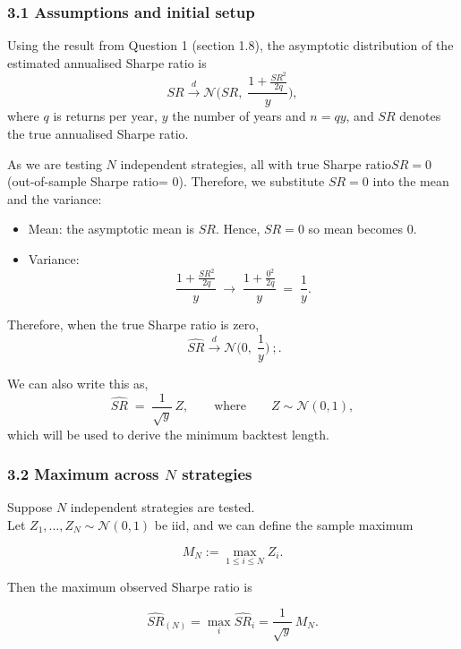 \documentclass[
  12pt,
]{article}
\providecommand{\tightlist}{%
  \setlength{\itemsep}{0pt}\setlength{\parskip}{0pt}}
\begin{document}
\subsubsection{3.1 Assumptions and initial
setup}\label{assumptions-and-initial-setup}

Using the result from Question 1 (section 1.8), the asymptotic
distribution of the estimated annualised Sharpe ratio is \[
\widehat{SR}\xrightarrow{d} \mathcal{N}\!\Big(SR,\; \frac{1+\tfrac{SR^2}{2q}}{y}\Big),
\] where \(q\) is returns per year, \(y\) the number of years and
\(n=qy\), and \(SR\) denotes the true annualised Sharpe ratio.

As we are testing \(N\) independent strategies, all with true Sharpe
ratio\(SR = 0\) (out-of-sample Sharpe ratio= 0). Therefore, we
substitute \(SR=0\) into the mean and the variance:

\begin{itemize}
\tightlist
\item
  Mean: the asymptotic mean is \(SR\). Hence, \(SR=0\) so mean becomes
  \(0\).
\item
  Variance: \[
  \frac{1+\tfrac{SR^2}{2q}}{y}
  \;\longrightarrow\;
  \frac{1+\tfrac{0^2}{2q}}{y}
  \;=\; \frac{1}{y}.
  \]
\end{itemize}

Therefore, when the true Sharpe ratio is zero, \[
\;\widehat{SR}\xrightarrow{d} \mathcal{N}\!\Big(0,\; \frac{1}{y}\Big)\ \tag{1}; .
\]

We can also write this as,\[
\widehat{SR} \;=\; \frac{1}{\sqrt{y}}\,Z,\qquad\text{where} \qquad  Z\sim\mathcal{N}(0,1) \tag{2},
\] which will be used to derive the minimum backtest length.

\subsubsection{\texorpdfstring{3.2 Maximum across \(N\)
strategies}{3.2 Maximum across N strategies}}\label{maximum-across-n-strategies}

Suppose \(N\) independent strategies are tested.\\
Let \(Z_1,\dots,Z_N \sim \mathcal{N}(0,1)\) be iid, and we can define
the sample maximum

\[
M_N := \max_{1 \le i \le N} Z_i.
\]

Then the maximum observed Sharpe ratio is

\[
\widehat{SR}_{(N)} = \max_{i} \widehat{SR}_i = \frac{1}{\sqrt{y}}\,M_N. \tag{3}
\]
\end{document}
